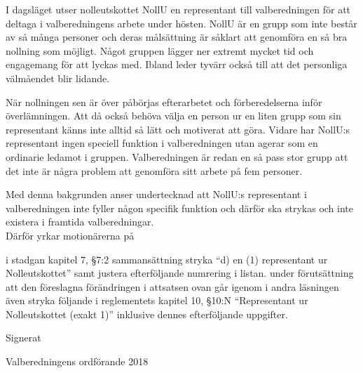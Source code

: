 \documentclass[../_main/handlingar.tex]{subfiles}
\begin{document}
I dagsläget utser nolleutskottet NollU en representant till valberedningen för att deltaga i valberedningens arbete under hösten. NollU är en grupp som inte består av så många personer och deras målsättning är såklart att genomföra en så bra nollning som möjligt. Något gruppen lägger ner extremt mycket tid och engagemang för att lyckas med. Ibland leder tyvärr också till att det personliga välmåendet blir lidande. 

När nollningen sen är över påbörjas efterarbetet och förberedelserna inför överlämningen. Att då också behöva välja en person ur en liten grupp som sin representant känns inte alltid så lätt och motiverat att göra. Vidare har NollU:s representant ingen speciell funktion i valberedningen utan agerar som en ordinarie ledamot i gruppen. Valberedningen är redan en så pass stor grupp att det inte är några problem att genomföra sitt arbete på fem personer. 

Med denna bakgrunden anser undertecknad att NollU:s representant i valberedningen inte fyller någon specifik funktion och därför ska strykas och inte existera i framtida valberedningar. 
\\

Därför yrkar motionärerna på
\begin{attsatser}
  \att i stadgan kapitel 7, §7:2 sammansättning stryka ``d) en (1) representant ur Nolleutskottet'' samt justera efterföljande numrering i listan.
  \att under förutsättning att den föreslagna förändringen i attsatsen ovan går igenom i andra läsningen även stryka följande i reglementets kapitel 10, §10:N ``Representant ur Nolleutskottet (exakt 1)'' inklusive dennes efterföljande uppgifter.
\end{attsatser}

\begin{signatures}{1}
    Signerat
    \signature{Pontus Landgren}{Valberedningens ordförande 2018}

\end{signatures}
\end{document}
